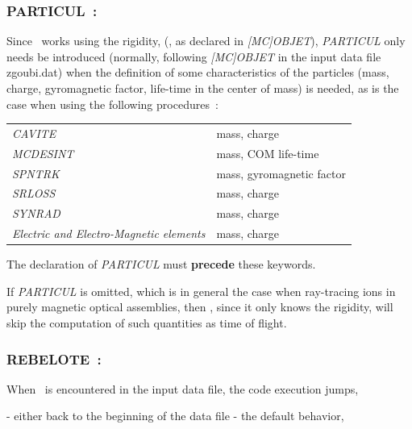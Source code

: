  \newpage

\subsubsection*{PARTICUL~: \PARTICULTitl}  \label{PARTICUL} 
\medskip 

Since \zgoubi\ works  using the rigidity, (\BORO, as declared in \textsl{[MC]OBJET}), 
\textsl{PARTICUL} only needs  be introduced (normally, following \textsl{[MC]OBJET} in the input data file zgoubi.dat) 
 when  the definition of some characteristics of the particles 
(mass, charge, gyromagnetic factor, life-time in the 
center of mass)  is needed, as is the case when using the following procedures~: 

\bigskip           

\begin{tabular}{>{\sl}l!{~:}l}
  CAVITE    & mass,  charge \\
  MCDESINT  & mass,  COM  life-time\\
  SPNTRK    & mass,  gyromagnetic factor \\
  SRLOSS    & mass, charge \\
  SYNRAD    & mass, charge \\
  Electric and Electro-Magnetic elements
            & mass, charge 
\end{tabular}
\bigskip           

\noindent The declaration of \textsl{PARTICUL} must \textbf{precede} these keywords. 

\medskip

\noindent
If \textsl{PARTICUL} is omitted, which is in general the case when ray-tracing ions
in purely magnetic optical assemblies, then \zgoubi, since it  only knows the rigidity, 
 will  skip the computation of  such quantities as  time of flight. 



 \newpage

\subsubsection*{REBELOTE~: \REBELOTETitl} \label{REBELOTE}     
\medskip


When \REBELOTE\ is encountered in the input data file, the code execution jumps, 

- either back to the beginning of the data file - the default behavior,  


